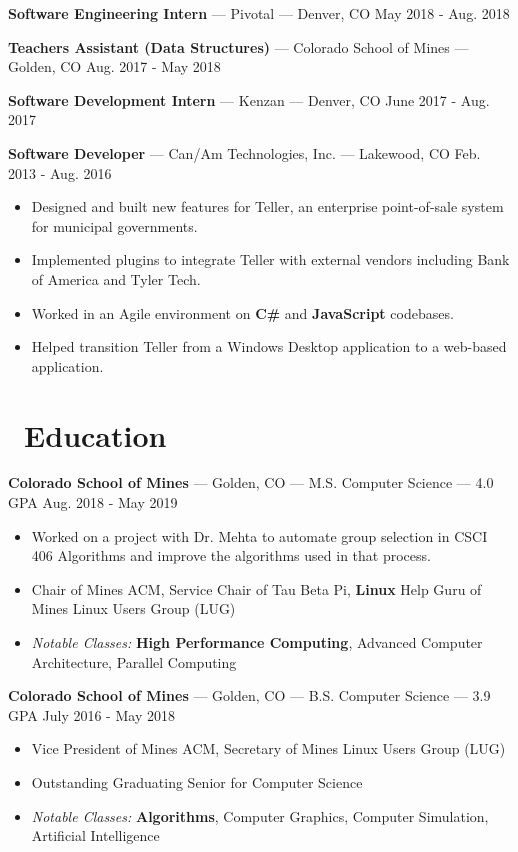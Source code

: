 \documentclass[10pt,letterpaper]{article}
\begin{document}
\textbf{Software Engineering Intern} --- Pivotal --- Denver, CO
\hfill May 2018 - Aug. 2018

\vspace{2pt}
\textbf{Teachers Assistant (Data Structures)} --- Colorado School of Mines ---
Golden, CO \hfill Aug. 2017 - May 2018

\vspace{2pt}
\textbf{Software Development Intern} --- Kenzan --- Denver, CO
\hfill June 2017 - Aug. 2017

\vspace{2pt}
\textbf{Software Developer} --- Can/Am Technologies, Inc. --- Lakewood, CO
\hfill Feb. 2013 - Aug. 2016
\begin{itemize}
    \item Designed and built new features for Teller, an enterprise
        point-of-sale system for municipal governments.
    \item Implemented plugins to integrate Teller with external vendors
        including Bank of America and Tyler Tech.
    \item Worked in an Agile environment on \textbf{C\#} and \textbf{JavaScript}
        codebases.
    \item Helped transition Teller from a Windows Desktop application to a
        web-based application.
\end{itemize}

\section*{\faBook\ Education}
\textbf{Colorado School of Mines} --- Golden, CO --- M.S. Computer Science --- 4.0 GPA
\hfill Aug. 2018 - May 2019
\begin{itemize}
    \item Worked on a project with Dr. Mehta to automate group selection in
        CSCI 406 Algorithms and improve the algorithms used in that process.
    \item Chair of Mines ACM, Service Chair of Tau Beta Pi, \textbf{Linux} Help
        Guru of Mines Linux Users Group (LUG)
    \item \textit{Notable Classes:} \textbf{High Performance Computing},
        Advanced Computer Architecture, Parallel Computing
\end{itemize}

\textbf{Colorado School of Mines} --- Golden, CO --- B.S. Computer Science --- 3.9 GPA
\hfill July 2016 - May 2018
\begin{itemize}
    \item Vice President of Mines ACM, Secretary of Mines Linux Users Group
        (LUG)
    \item Outstanding Graduating Senior for Computer Science
    \item \textit{Notable Classes:} \textbf{Algorithms}, Computer Graphics,
        Computer Simulation, Artificial Intelligence
\end{itemize}
\end{document}
